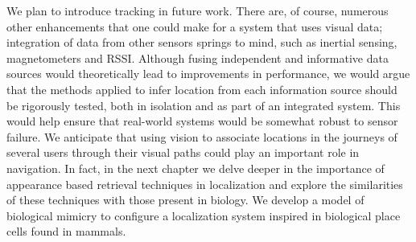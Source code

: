 We plan to introduce tracking in future work. There are, of course, numerous other enhancements that one could make for a system that uses visual data; integration of data from other sensors springs to mind, such as inertial sensing, magnetometers and RSSI.  Although fusing independent and informative data sources would theoretically lead to improvements in performance, we would argue that the methods applied to infer location from each information source should be rigorously tested, both in isolation and as part of an integrated system.  This would help ensure that real-world systems would be somewhat robust to sensor failure. We anticipate that using vision to associate locations in the journeys of several users through their visual paths could play an important role in navigation. In fact, in the next chapter we delve deeper in the importance of appearance based retrieval techniques in localization and explore the similarities of these techniques with those present in biology. We develop a model of biological mimicry to configure a localization system inspired in biological place cells found in mammals.


\label{sec:conclusion}


